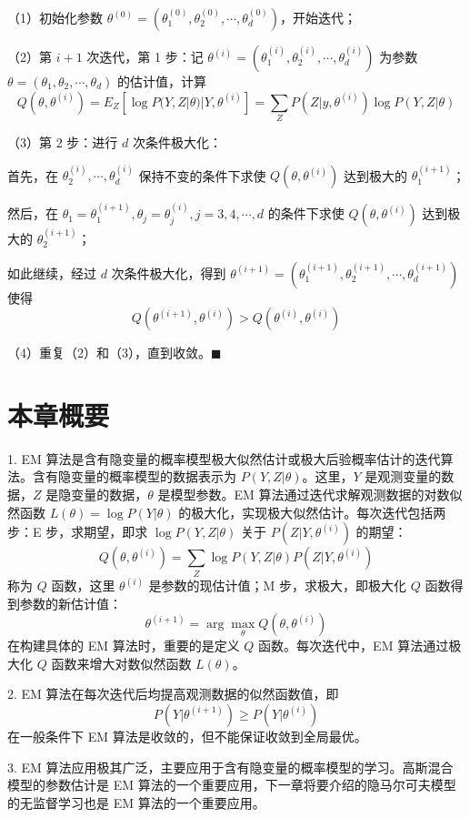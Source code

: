 \documentclass[UTF8,12pt,a4paper,fontset=fandol]{ctexart}
\begin{document}
（1）初始化参数 $\theta^{(0)}=(\theta_1^{(0)},\theta_2^{(0)},\cdots,\theta_d^{(0)})$，开始迭代；

（2）第 $i+1$ 次迭代，第 1 步：记 $\theta^{(i)}=(\theta_1^{(i)},\theta_2^{(i)},\cdots,\theta_d^{(i)})$ 为参数 $\theta=(\theta_1,\theta_2,\cdots,\theta_d)$ 的估计值，计算
\[
Q(\theta,\theta^{(i)})=E_Z[\log P(Y,Z|\theta)|Y,\theta^{(i)}]
=\sum_ZP(Z|y,\theta^{(i)})\log P(Y,Z|\theta)
\]

（3）第 2 步：进行 $d$ 次条件极大化：

首先，在 $\theta_2^{(i)},\cdots,\theta_d^{(i)}$ 保持不变的条件下求使 $Q(\theta,\theta^{(i)})$ 达到极大的 $\theta_1^{(i+1)}$；

然后，在 $\theta_1=\theta_1^{(i+1)},\theta_j=\theta_j^{(i)},j=3,4,\cdots,d$ 的条件下求使 $Q(\theta,\theta^{(i)})$ 达到极大的 $\theta_2^{(i+1)}$；

如此继续，经过 $d$ 次条件极大化，得到 $\theta^{(i+1)}=(\theta_1^{(i+1)},\theta_2^{(i+1)},\cdots,\theta_d^{(i+1)})$ 使得
\[
Q(\theta^{(i+1)},\theta^{(i)})>Q(\theta^{(i)},\theta^{(i)})
\]

（4）重复（2）和（3），直到收敛。\hfill$\blacksquare$

\section*{本章概要}

1. EM 算法是含有隐变量的概率模型极大似然估计或极大后验概率估计的迭代算法。含有隐变量的概率模型的数据表示为 $P(Y,Z|\theta)$。这里，$Y$ 是观测变量的数据，$Z$ 是隐变量的数据，$\theta$ 是模型参数。EM 算法通过迭代求解观测数据的对数似然函数 $L(\theta)=\log P(Y|\theta)$ 的极大化，实现极大似然估计。每次迭代包括两步：E 步，求期望，即求 $\log P(Y,Z|\theta)$ 关于 $P(Z|Y,\theta^{(i)})$ 的期望：
\[
Q(\theta,\theta^{(i)})=\sum_Z\log P(Y,Z|\theta)P(Z|Y,\theta^{(i)})
\]
称为 $Q$ 函数，这里 $\theta^{(i)}$ 是参数的现估计值；M 步，求极大，即极大化 $Q$ 函数得到参数的新估计值：
\[
\theta^{(i+1)}=\arg\max_\theta Q(\theta,\theta^{(i)})
\]
在构建具体的 EM 算法时，重要的是定义 $Q$ 函数。每次迭代中，EM 算法通过极大化 $Q$ 函数来增大对数似然函数 $L(\theta)$。

2. EM 算法在每次迭代后均提高观测数据的似然函数值，即
\[
P(Y|\theta^{(i+1)})\geqslant P(Y|\theta^{(i)})
\]
在一般条件下 EM 算法是收敛的，但不能保证收敛到全局最优。

3. EM 算法应用极其广泛，主要应用于含有隐变量的概率模型的学习。高斯混合模型的参数估计是 EM 算法的一个重要应用，下一章将要介绍的隐马尔可夫模型的无监督学习也是 EM 算法的一个重要应用。
\end{document}
